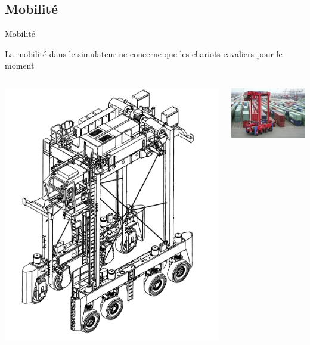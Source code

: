 \documentclass{beamer}
\begin{document}
 \subsection{Mobilité}
  \begin{frame}{Mobilité}
  
  \begin{center}
  La mobilité dans le simulateur ne concerne que les chariots cavaliers pour le moment
\vspace{0.8cm}

\begin{columns}
    \begin{column}[l]{3.0cm}	
      \includegraphics[height=.25\textheight]{fig/schema_sc.jpg}
    \end{column}
    \begin{column}[c]{4.0cm}	
      \includegraphics[height=.25\textheight]{fig/chariot_cavalier.jpg}

\end{column}
\end{columns}
\end{center}
\end{frame}
\end{document}
